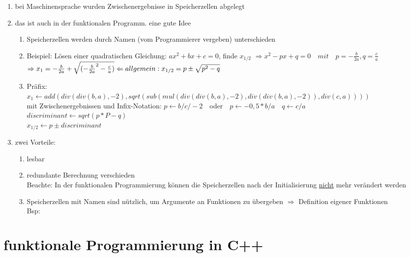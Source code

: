 \documentclass{article}
\begin{document}
	\begin{enumerate}
		\item bei Maschinensprache wurden Zwischenergebnisse in Speicherzellen abgelegt
		\item das ist auch in der funktionalen Programm. eine gute Idee
		\begin{enumerate}
			\item Speicherzellen werden durch Namen (vom Programmierer vergeben) unterschieden
			\item Beispiel: Lösen einer quadratischen Gleichung: $ax^2+bx+c =0$, finde $x_{1/2}$
					$\Rightarrow x^2-px+q =0 \quad mit \quad p = -\frac{b}{2a}, q = \frac{c}{a}$
					$\Rightarrow x_1 = -\frac{b}{2a} + \sqrt{(-\frac{b}{2a}^2 - \frac{c}{a})} \\ \Leftarrow allgemein: x_{1/2} = p \pm \sqrt{p^2-q}$
			\item Präfix: \\ $x_1 \leftarrow add(div(div(b,a),-2), sqrt(sub(mul(div(div(b,a),-2), div(div(b,a), -2)), div(c,a))))$ \\
					mit Zwischenergebnissen und Infix-Notation: $p \leftarrow b/c/-2 \quad $oder$ \quad p \leftarrow -0,5*b/a \quad q \leftarrow c/a$ \\ $discriminant \leftarrow sqrt(p*P-q)$ \\
					$x_{1/2} \leftarrow p \pm discriminant$
		\end{enumerate}
		\item zwei Vorteile:
		\begin{enumerate}
			\item lesbar
			\item redundante Berechnung verschieden \\ Beachte: In der funktionalen Programmierung können die Speicherzellen nach der Initialisierung \underline{nicht} mehr verändert werden
			\item Speicherzellen mit Namen sind nützlich, um Argumente an Funktionen zu übergeben $\Rightarrow$ Definition eigener Funktionen \\
			Bsp: 
		\end{enumerate}
	\end{enumerate}
	
	\section{funktionale Programmierung in C++}
	
\end{document}
